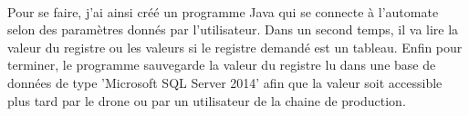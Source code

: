         \paragraph*{}
        Pour se faire, j'ai ainsi créé un programme Java qui se connecte à l'automate selon des paramètres donnés par l'utilisateur. Dans un second temps, il va lire la valeur du registre ou les valeurs si le registre demandé est un tableau. Enfin pour terminer, le programme sauvegarde la valeur du registre lu dans une base de données de type 'Microsoft SQL Server 2014' afin que la valeur soit accessible plus tard par le drone ou par un utilisateur de la chaine de production.